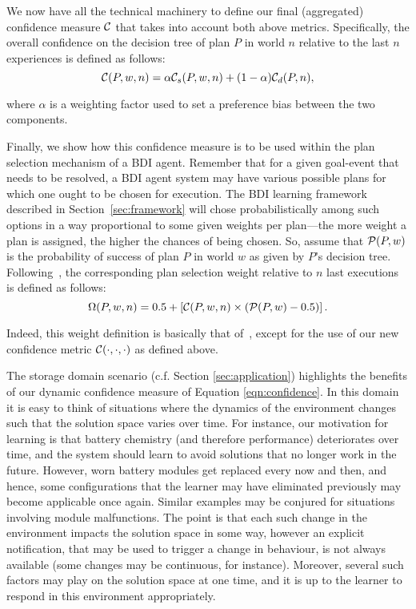 We now have all the technical machinery to define our final (aggregated) confidence measure $\C$ that takes into account both above metrics. Specifically, the overall confidence on the decision tree of plan $P$ in world $n$ relative to the last $n$ experiences is defined as follows:
\[
	\C(P,w,n) = \alpha\C_s(P,w,n) + (1-\alpha)\C_d(P,n),
\label{eqn:confidence}
\]

\noindent
where $\alpha$ is a weighting factor used to set a preference bias between the two components.



Finally, we show how this confidence measure is to be used within the plan selection mechanism of a BDI agent. Remember that for a given goal-event that needs to be resolved, a BDI agent system may have various possible plans for which one ought to be chosen for execution. The BDI learning framework described in Section~\ref{sec:framework} will chose probabilistically among such options in a way proportional to some given weights per plan---the more weight a plan is assigned, the higher the chances of being chosen. 
So, assume that $\P(P,w)$ is the probability of success of plan $P$ in world $w$ as given by $P$'s decision tree. Following~\cite{singh10:extending, singh10:learning}, the corresponding plan selection weight relative to $n$ last executions is defined as follows: 
\[
	\Omega(P,w,n) = 0.5 + \left[  \C(P,w,n) \times  \left( \P(P,w) - 0.5 \right)  \right].
\label{eqn:omega}   
\]

Indeed, this weight definition is basically that of~\cite{singh10:extending, singh10:learning}, except for the use of our new confidence metric $\C(\cdot,\cdot,\cdot)$ as defined above.


The storage domain scenario (c.f. Section \ref{sec:application}) highlights the benefits of our dynamic confidence measure of Equation \ref{eqn:confidence}. In this domain it is easy to think of situations where the dynamics of the environment changes such that the solution space varies over time. For instance, our motivation for learning is that battery chemistry (and therefore performance) deteriorates over time, and the system should learn to avoid solutions that no longer work in the future. However, worn battery modules get replaced every now and then, and hence, some configurations that the learner may have eliminated previously may become applicable once again. Similar examples may be conjured for situations involving module malfunctions. The point is that each such change in the environment impacts the solution space in some way, however an explicit notification, that may be used to trigger a change in behaviour, is not always available (some changes may be continuous, for instance). Moreover, several such factors may play on the solution space at one time, and it is up to the learner to respond in this environment appropriately.


